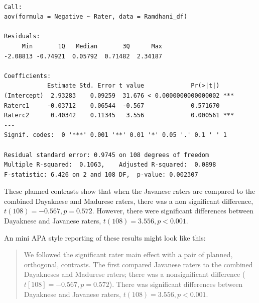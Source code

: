 \documentclass[
  11pt,
]{book}
\newenvironment{Shaded}{\begin{snugshade}}{\end{snugshade}}
\newcommand{\DecValTok}[1]{\textcolor[rgb]{0.06,0.06,0.06}{#1}}
\newcommand{\FunctionTok}[1]{\textcolor[rgb]{0.27,0.27,0.27}{\textbf{#1}}}
\newcommand{\NormalTok}[1]{#1}
\newcommand{\OtherTok}[1]{\textcolor[rgb]{0.37,0.37,0.37}{#1}}
\newcommand{\SpecialCharTok}[1]{\textcolor[rgb]{0.43,0.43,0.43}{\textbf{#1}}}
\begin{document}
\begin{verbatim}

Call:
aov(formula = Negative ~ Rater, data = Ramdhani_df)

Residuals:
     Min       1Q   Median       3Q      Max 
-2.08813 -0.74921  0.05792  0.71482  2.34187 

Coefficients:
            Estimate Std. Error t value             Pr(>|t|)    
(Intercept)  2.93283    0.09259  31.676 < 0.0000000000000002 ***
Raterc1     -0.03712    0.06544  -0.567             0.571670    
Raterc2      0.40342    0.11345   3.556             0.000561 ***
---
Signif. codes:  0 '***' 0.001 '**' 0.01 '*' 0.05 '.' 0.1 ' ' 1

Residual standard error: 0.9745 on 108 degrees of freedom
Multiple R-squared:  0.1063,    Adjusted R-squared:  0.0898 
F-statistic: 6.426 on 2 and 108 DF,  p-value: 0.002307
\end{verbatim}

\begin{Shaded}
\end{Shaded}

These planned contrasts show that when the Javanese raters are compared to the combined Dayaknese and Madurese raters, there was a non significant difference, \(t(108) = -0.567, p = 0.572\). However, there were significant differences between Dayaknese and Javanese raters, \(t(108) = 3.556, p < 0.001\).

An mini APA style reporting of these results might look like this:

\begin{quote}
We followed the significant rater main effect with a pair of planned, orthogonal, contrasts. The first compared Javanese raters to the combined Dayakneses and Madurese raters; there was a nonsignificant difference (\(t[108] = -0.567, p = 0.572\)). There was significant differences between Dayaknese and Javanese raters, \(t(108) = 3.556, p < 0.001\).
\end{quote}
\end{document}
